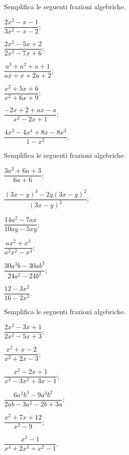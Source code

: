 \begin{esercizio}[\Ast]
\label{ese:14.5}
Semplifica le seguenti frazioni algebriche.
\begin{multicols}{3}
\begin{enumeratea}
 \item $\dfrac{2x^{2}-x-1}{3x^{2}-x-2}$;
 \item $\dfrac{2x^{2}-5x+2}{2x^{2}-7x+6}$;
 \item $\dfrac{a^{3}+a^{2}+a+1}{ax+x+2a+2}$;
 \item $\dfrac{x^{2}+5x+6}{x^{2}+6x+9}$;
 \item $\dfrac{-2x+2+ax-a}{x^{2}-2x+1}$;
 \item $\dfrac{4x^{3}-4x^{4}+8x-8x^{2}}{1-x^{2}}$.
\end{enumeratea}
\end{multicols}
\end{esercizio}
\pagebreak

\begin{esercizio}[\Ast]
\label{ese:14.6}
Semplifica le seguenti frazioni algebriche.
\begin{multicols}{2}
\begin{enumeratea}
 \item $\dfrac{3a^{2}+6a+3}{6a+6}$;
 \item $\dfrac{(3x-y)^{3}-2y(3x-y)^{2}}{(3x-y)^{2}}$;
 \item $\dfrac{14a^{2}-7ax}{10ay-5xy}$;
 \item $\dfrac{ax^{2}+x^{3}}{a^{2}x^{2}-x^{4}}$;
 \item $\dfrac{30a^{3}b-30ab^{3}}{24a^{2}-24b^{2}}$;
 \item $\dfrac{12-3x^{2}}{16-2x^{3}}$.
\end{enumeratea}
\end{multicols}
\end{esercizio}

\begin{esercizio}[\Ast]
\label{ese:14.7}
Semplifica le seguenti frazioni algebriche.
\begin{multicols}{3}
\begin{enumeratea}
 \item $\dfrac{2x^{2}-3x+1}{2x^{2}-5x+3}$;
 \item $\dfrac{x^{2}+x-2}{x^{2}+2x-3}$;
 \item $\dfrac{x^{2}-2x+1}{x^{3}-3x^{2}+3x-1}$;
 \item $\dfrac{6a^{2}b^{3}-9a^{3}b^{2}}{2ab-3a^{2}-2b+3a}$;
 \item $\dfrac{x^{2}+7x+12}{x^{2}-9}$;
 \item $\dfrac{x^{3}-1}{x^{4}+2x^{3}+x^{2}-1}$.
\end{enumeratea}
\end{multicols}
\end{esercizio}

